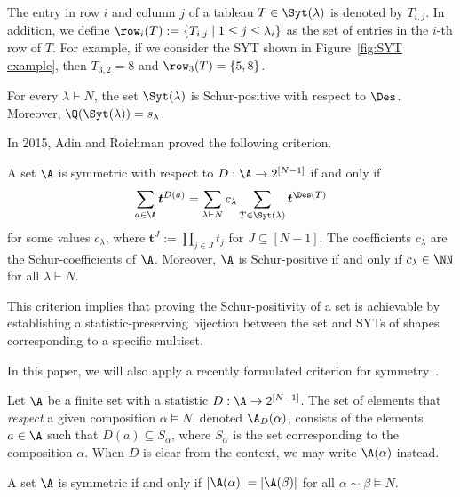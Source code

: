 The entry in row $i$ and column $j$ of a tableau $T \in \Syt(\lambda)$ is denoted by $T_{i,j}$. In addition, we define $\row_i(T) := \{T_{i,j} \mid 1 \le j \le \lambda_i\}$ as the set of entries in the $i$-th row of $T$. For example, if we consider the SYT shown in Figure~\ref{fig:SYT example}, then $T_{3,2} = 8$ and $\row_3(T) = \{5,8\}$.

\begin{theorem}
\label{thm:schur functions young tableaux}
    For every $\lambda \vdash N$, the set $\Syt(\lambda)$ is Schur-positive with respect to $\Des$. Moreover, $\Q(\Syt(\lambda)) = s_\lambda$.
\end{theorem}

In 2015, Adin and Roichman proved the following criterion.
\begin{theorem}
\label{thm:criterion schur positive young}
    A set $\A$ is symmetric with respect to $D:\A\to 2^{[N-1]}$ if and only if
    \[
        \sum_{a \in \A} \boldsymbol{t}^{D(a)} = \sum_{\lambda \vdash N} c_\lambda \sum_{T \in \Syt(\lambda)} \boldsymbol{t}^{\Des(T)}
    \]
    for some values $c_\lambda$, where $\boldsymbol{t}^J := \prod_{j \in J} t_j$ for $J \subseteq [N-1]$. The coefficients $c_\lambda$ are the Schur-coefficients of $\A$. Moreover, $\A$ is Schur-positive if and only if $c_{\lambda} \in \NN$ for all $\lambda \vdash N$.
\end{theorem}

This criterion implies that proving the Schur-positivity of a set is achievable by establishing a statistic-preserving bijection between the set and SYTs of shapes corresponding to a specific multiset.

In this paper, we will also apply a recently formulated criterion for symmetry~\cite{my_pattern_theorem}.
\begin{definition}
\label{def:respect composition}
    Let $\A$ be a finite set with a statistic $D:\A \to 2^{[N-1]}$. The set of elements that \emph{respect} a given composition $\alpha \vDash N$, denoted $\A_D(\alpha)$, consists of the elements $a \in \A$ such that $D(a) \subseteq S_\alpha$, where $S_\alpha$ is the set corresponding to the composition $\alpha$. When $D$ is clear from the context, we may write $\A(\alpha)$ instead.
\end{definition}

\begin{lemma}
\label{lem:my symmetry criterion}
    A set $\A$ is symmetric if and only if $|\A(\alpha)| = |\A(\beta)|$ for all $\alpha \sim \beta \vDash N$.
\end{lemma}

